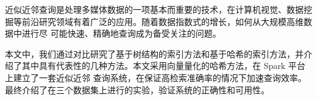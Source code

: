 
 

\makeatletter
\ifthu@bachelor\relax\else
  \ifthu@doctor
  \else
    \ifthu@master
    \fi
  \fi
\fi
\makeatother







\begin{cabstract}
  近似近邻查询是处理多媒体数据的一项基本而重要的技术，在计算机视觉、数据挖掘等前沿研究领域有着广泛的应用。随着数据指数式的增长，如何从大规模高维数据中进行尽
  可能快速、精确地查询成为备受关注的问题。

  本文中，我们通过对比研究了基于树结构的索引方法和基于哈希的索引方法，并介绍了其中具有代表性的几种方法。本文采用向量量化的哈希方法，在 Spark 平台上建立了一套近似近邻
  查询系统，在保证高检索准确率的情况下加速查询效率。最终介绍了在三个数据集上进行的实验，验证系统的正确性和可用性。
\end{cabstract}


